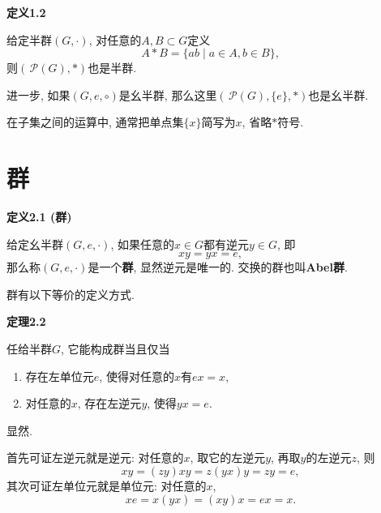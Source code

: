 \documentclass[UTF8]{ctexart}
\begin{document}
\hypertarget{sec:定义1.2}{}
\noindent\textbf{定义1.2}

给定半群$(G,\cdot)$, 对任意的$A,B\subset G$定义
\[
    A\ast B=\{ab\mid a\in A,b\in B\},
\]
则$(\,\mathcal{P}(G),\ast)$也是半群.

进一步, 如果$(G,e,\circ)$是幺半群, 那么这里$(\,\mathcal{P}(G),\{e\},\ast)$也是幺半群.

\vspace{10pt}

在子集之间的运算中, 通常把单点集$\{x\}$简写为$x$, 省略$\ast$符号.





\newpage

\section{群}

\hypertarget{sec:定义2.1}{}
\noindent\textbf{定义2.1 (群)}

给定幺半群$(G,e,\cdot)$, 如果任意的$x\in G$都有逆元$y\in G$, 即
\[
    xy=yx=e,
\]
那么称$(G,e,\cdot)$是一个\textbf{群}, 显然逆元是唯一的. 交换的群也叫\textbf{Abel群}.

\vspace{10pt}

群有以下等价的定义方式.

\vspace{10pt}

\hypertarget{sec:定理2.2}{}
\noindent\textbf{定理2.2}

任给半群$G$, 它能构成群当且仅当
\begin{enumerate}
    \item 存在左单位元$e$, 使得对任意的$x$有$ex=x$,
    \item 对任意的$x$, 存在左逆元$y$, 使得$yx=e$.
\end{enumerate}


 显然.


首先可证左逆元就是逆元: 对任意的$x$, 取它的左逆元$y$, 再取$y$的左逆元$z$, 则
\[
    xy=(zy)xy=z(yx)y=zy=e,
\]
其次可证左单位元就是单位元: 对任意的$x$,
\begin{equation*}
    xe=x(yx)=(xy)x=ex=x.
\tag*{\qedsymbol}\end{equation*}

\vspace{10pt}
\end{document}
